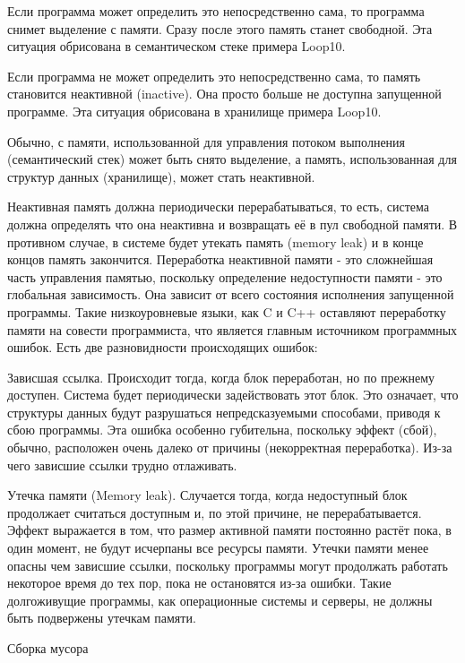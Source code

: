 Если программа может определить это непосредственно сама, то программа снимет выделение с памяти. Сразу после этого память станет свободной. Эта ситуация обрисована в семантическом стеке примера Loop10.

Если программа не может определить это непосредственно сама, то память становится неактивной (inactive). Она просто больше не доступна запущенной программе. Эта ситуация обрисована в хранилище примера Loop10.

Обычно, с памяти, использованной для управления потоком выполнения (семантический стек) может быть снято выделение, а память, использованная для структур данных (хранилище), может стать неактивной.

Неактивная память должна периодически перерабатываться, то есть, система должна определять что она неактивна и возвращать её в пул свободной памяти. В противном случае, в системе будет утекать память (memory leak) и в конце концов память закончится. Переработка неактивной памяти - это сложнейшая часть управления памятью, поскольку определение недоступности памяти - это глобальная зависимость. Она зависит от всего состояния исполнения запущенной программы. Такие низкоуровневые языки, как C и C++ оставляют переработку памяти на совести программиста, что является главным источником программных ошибок. Есть две разновидности происходящих ошибок:

Зависшая ссылка. Происходит тогда, когда блок переработан, но по прежнему доступен. Система будет периодически задействовать этот блок. Это означает, что структуры данных будут разрушаться непредсказуемыми способами, приводя к сбою программы. Эта ошибка особенно губительна, поскольку эффект (сбой), обычно, расположен очень далеко от причины (некорректная переработка). Из-за чего зависшие ссылки трудно отлаживать.

Утечка памяти (Memory leak). Случается тогда, когда недоступный блок продолжает считаться доступным и, по этой причине, не перерабатывается. Эффект выражается в том, что размер активной памяти постоянно растёт пока, в один момент, не будут исчерпаны все ресурсы памяти. Утечки памяти менее опасны чем зависшие ссылки, поскольку программы могут продолжать работать некоторое время до тех пор, пока не остановятся из-за ошибки. Такие долгоживущие программы, как операционные системы и серверы, не должны быть подвержены утечкам памяти.

Сборка мусора

